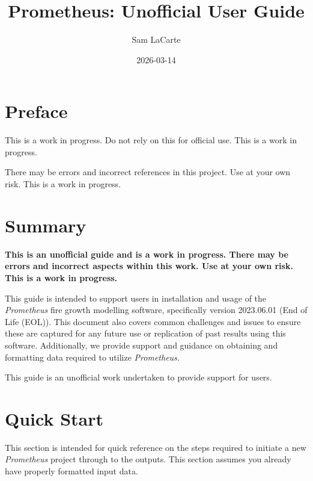 \documentclass[
  letterpaper,
  DIV=11,
  numbers=noendperiod]{scrreprt}
\title{Prometheus: Unofficial User Guide}
\author{Sam LaCarte}
\date{2026-03-14}
\renewcommand*\contentsname{Table of contents}
\newcommand\contentsname{Table of contents}
\begin{document}
\maketitle

\renewcommand*\contentsname{Table of contents}
{
\setcounter{tocdepth}{2}
\tableofcontents
}


\chapter*{Preface}\label{preface}


This is a work in progress. Do not rely on this for official use. This
is a work in progress.

There may be errors and incorrect references in this project. Use at
your own risk. This is a work in progress.


\chapter{Summary}\label{summary}

\textbf{This is an unofficial guide and is a work in progress. There may
be errors and incorrect aspects within this work. Use at your own risk.
This is a work in progress.}

This guide is intended to support users in installation and usage of the
\emph{Prometheus} fire growth modelling software, specifically version
2023.06.01 (End of Life (EOL)). This document also covers common
challenges and issues to ensure these are captured for any future use or
replication of past results using this software. Additionally, we
provide support and guidance on obtaining and formatting data required
to utilize \emph{Prometheus.}

This guide is an unofficial work undertaken to provide support for
users.


\chapter{Quick Start}\label{quick-start}

This section is intended for quick reference on the steps required to
initiate a new \emph{Prometheus} project through to the outputs. This
section assumes you already have properly formatted input data.
\end{document}
